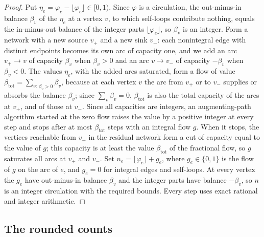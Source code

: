 \begin{proof}
Put \(\eta_e=\varphi_e-\lfloor\varphi_e\rfloor\in[0,1)\). Since \(\varphi\)
is a circulation, the out-minus-in balance \(\beta_v\) of the \(\eta_e\) at
a vertex \(v\), to which self-loops contribute nothing, equals the
in-minus-out balance of the integer parts \(\lfloor\varphi_e\rfloor\), so
\(\beta_v\) is an integer. Form a network with a new source \(v_+\) and a
new sink \(v_-\): each nonintegral edge with distinct endpoints becomes its
own arc of capacity one, and we add an arc \(v_+\to v\) of capacity
\(\beta_v\) when \(\beta_v>0\) and an arc \(v\to v_-\) of capacity
\(-\beta_v\) when \(\beta_v<0\). The values \(\eta_e\), with the added arcs
saturated, form a flow of value
\(\beta_{\mathrm{tot}}=\sum_{v:\,\beta_v>0}\beta_v\), because at each
vertex \(v\) the arc from \(v_+\) or to \(v_-\) supplies or absorbs the
balance \(\beta_v\); since \(\sum_v\beta_v=0\), \(\beta_{\mathrm{tot}}\) is
also the total capacity of the arcs at \(v_+\), and of those at \(v_-\).
Since all capacities are integers, an augmenting-path algorithm started at the zero
flow raises the value by a positive integer at every step and stops after at
most \(\beta_{\mathrm{tot}}\) steps with an integral flow \(g\). When it
stops, the vertices reachable from \(v_+\) in the residual network form a
cut of capacity equal to the value of \(g\); this capacity is at least the
value \(\beta_{\mathrm{tot}}\) of the fractional flow, so \(g\) saturates
all arcs at \(v_+\) and \(v_-\). Set \(n_e=\lfloor\varphi_e\rfloor+g_e\),
where \(g_e\in\{0,1\}\) is the flow of \(g\) on the arc of \(e\), and
\(g_e=0\) for integral edges and self-loops. At every vertex the \(g_e\) have
out-minus-in balance \(\beta_v\) and the integer parts have balance
\(-\beta_v\), so \(n\) is an integer circulation with the required bounds.
Every step uses exact rational and integer arithmetic.
\end{proof}

\subsection{The rounded counts}
\label{subsec:rounded-counts}

